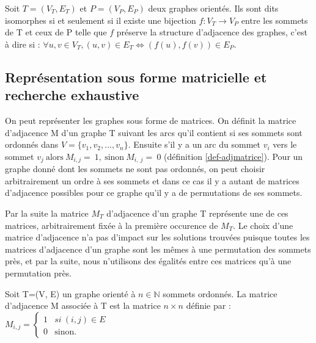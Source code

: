 \begin{defi}\label{def:isog}
Soit $T=(V_T, E_T)$ et $P=(V_P, E_P)$ deux graphes orientés. Ils sont dits isomorphes si et seulement si il existe une bijection $f:V_T\rightarrow V_P$ entre les sommets de T et ceux de P telle que $f$ préserve la structure d'adjacence des graphes, c'est à dire si : $\forall u, v \in V_T, (u, v) \in E_T \Leftrightarrow (f(u), f(v)) \in E_P$.
\end{defi}

\subsection{Représentation sous forme matricielle et recherche exhaustive}
On peut représenter les graphes sous forme de matrices. On définit la matrice d'adjacence M d'un graphe T suivant les arcs qu'il contient si ses sommets sont ordonnés dans $V=\{v_1, v_2, ..., v_n\}$. Ensuite s'il y a un arc du sommet $v_i$ vers le sommet
$v_j~\mbox{alors}~M_{i, j}=~1,~\mbox{sinon}~M_{i,~j}=~0$ (définition \ref{def-adjmatrice}).
Pour un graphe donné dont les sommets ne sont pas ordonnés, on peut choisir arbitrairement un ordre à ses sommets et dans ce cas il y a autant de matrices d'adjacence possibles pour ce graphe qu'il y a de permutations de ses sommets. 

Par la suite la matrice $M_T$ d'adjacence d'un graphe T représente une de ces matrices, arbitrairement fixée à la première occurence de $M_T$.
Le choix d'une matrice d'adjacence n'a pas d'impact sur les solutions trouvées puisque toutes les matrices d'adjacence d'un graphe sont les mêmes à une permutation des sommets près, et par la suite, nous n'utilisons des égalités entre ces matrices qu'à une permutation près.

\begin{defi}\label{def-adjmatrice}
Soit T=(V, E) un graphe orienté à $n \in \mathbb{N}$ sommets ordonnés. La matrice d'adjacence M associée à T est la matrice $n \times n$ définie par : 
$M_{i, j} = \left\{
  \begin{array}{ll}
	  1 & si\ (i, j) \in E
	\\0 & \mbox{sinon.}
  \end{array}
\right.
$
\end{defi}

